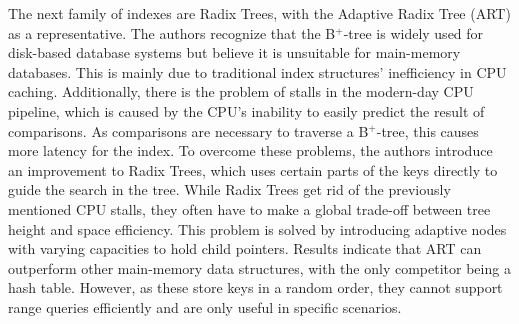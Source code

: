 The next family of indexes are Radix Trees, with the Adaptive Radix Tree (ART) \cite{Leis2013} as a representative. The authors recognize that the B$^+$-tree is widely used for disk-based database systems but believe it is unsuitable for main-memory databases. This is mainly due to traditional index structures' inefficiency in CPU caching. Additionally, there is the problem of stalls in the modern-day CPU pipeline, which is caused by the CPU's inability to easily predict the result of comparisons. As comparisons are necessary to  traverse a B$^+$-tree, this causes more latency for the index. To overcome these problems, the authors introduce an improvement to Radix Trees, which uses certain parts of the keys directly to guide the search in the tree. While Radix Trees get rid of the previously mentioned CPU stalls, they often have to make a global trade-off between tree height and space efficiency. This problem is solved by introducing adaptive nodes with varying capacities to hold child pointers. Results indicate that ART can outperform other main-memory data structures, with the only competitor being a hash table. However, as these store keys in a random order, they cannot support range queries efficiently and are only useful in specific scenarios.

